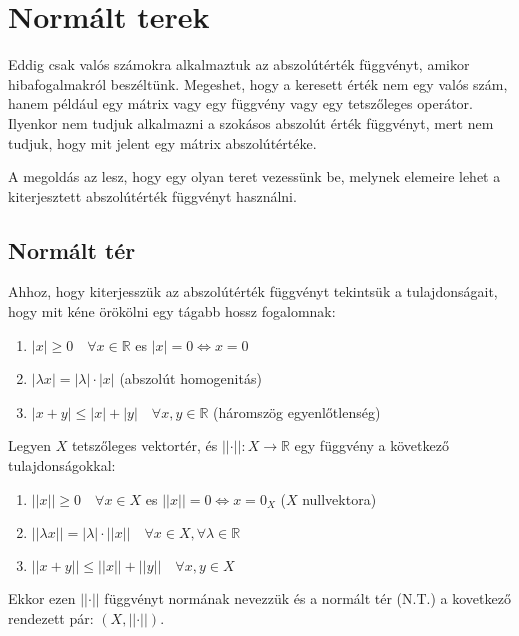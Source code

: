 \chapter{Normált terek}
Eddig csak valós számokra alkalmaztuk az abszolútérték függvényt, amikor hibafogalmakról beszéltünk. Megeshet, hogy a keresett érték nem egy valós szám, hanem például egy mátrix vagy egy függvény vagy egy tetszőleges operátor. Ilyenkor nem tudjuk alkalmazni a szokásos abszolút érték függvényt, mert nem tudjuk, hogy mit jelent egy mátrix abszolútértéke.

A megoldás az lesz, hogy egy olyan teret vezessünk be, melynek elemeire lehet a kiterjesztett abszolútérték függvényt használni.

\section{Normált tér}
Ahhoz, hogy kiterjesszük az abszolútérték függvényt tekintsük a tulajdonságait, hogy mit kéne örökölni egy tágabb hossz fogalomnak:
\begin{enumerate}
    \item $|x| \geq 0 \quad \forall x \in \mathbb{R}$ es $|x| = 0 \iff x = 0$
    \item $|\lambda x| = |\lambda|\cdot|x|$ (abszolút homogenitás)
    \item $|x + y| \leq |x| + |y| \quad \forall x,y \in \mathbb{R}$ (háromszög egyenlőtlenség)
\end{enumerate}

\begin{definition}
    Legyen $X$ tetszőleges vektortér, és $\lvert \lvert \cdot \rvert \rvert:X \to \mathbb{R}$ egy függvény a következő tulajdonságokkal:
    \begin{enumerate}
        \item $\lvert \lvert x \rvert \rvert \geq 0 \quad \forall x \in X$ es $\lvert \lvert x \rvert \rvert = 0 \iff x = 0_{X}$ ($X$ nullvektora)
        \item $\lvert \lvert \lambda x \rvert \rvert = \lvert \lambda \rvert \cdot \lvert \lvert x \rvert \rvert \quad \forall x \in X, \forall \lambda \in \mathbb{R}$
        \item $\lvert \lvert x + y \rvert \rvert \leq \lvert \lvert x \rvert \rvert + \lvert \lvert y \rvert \rvert \quad \forall x, y \in X$
    \end{enumerate}

Ekkor ezen $\lvert \lvert \cdot \rvert \rvert$ függvényt normának nevezzük és a normált tér (N.T.) a kovetkező rendezett pár: $(X, \lvert \lvert \cdot \rvert \rvert)$.
\end{definition}

